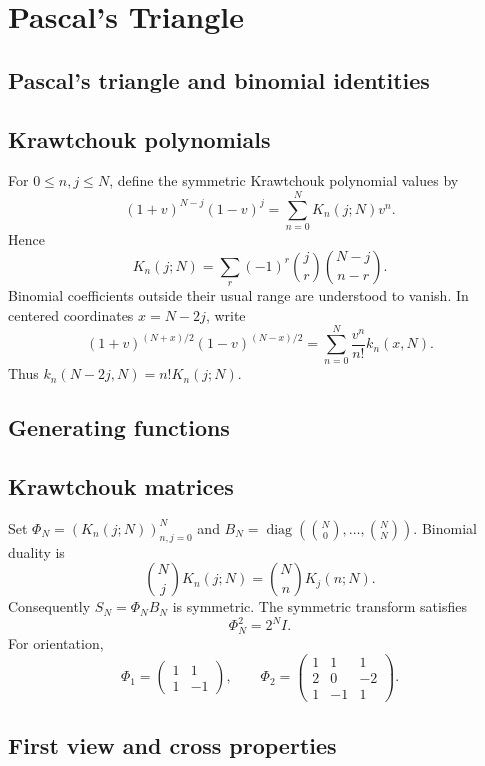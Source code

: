 \chapter{Pascal's Triangle}
\label{ch:1}
\section{Pascal's triangle and binomial identities}
\label{sec:1-1}

\section{Krawtchouk polynomials}
\label{sec:1-2}
For $0\leq n,j\leq N$, define the symmetric Krawtchouk polynomial values by
\begin{equation}\label{eq:gen}
(1+v)^{N-j}(1-v)^j=\sum_{n=0}^N K_n(j;N)v^n.
\end{equation}
Hence
\[
K_n(j;N)=\sum_r(-1)^r\binom jr\binom{N-j}{n-r}.
\]
Binomial coefficients outside their usual range are understood to vanish.
In centered coordinates $x=N-2j$, write
\[
(1+v)^{(N+x)/2}(1-v)^{(N-x)/2}
=\sum_{n=0}^N\frac{v^n}{n!}k_n(x,N).
\]
Thus $k_n(N-2j,N)=n!K_n(j;N)$.

\section{Generating functions}
\label{sec:1-3}

\section{Krawtchouk matrices}
\label{sec:1-4}
Set $\Phi_N=(K_n(j;N))_{n,j=0}^N$ and
$B_N=\operatorname{diag}(\binom N0,\ldots,\binom NN)$. Binomial duality is
\[
\binom Nj K_n(j;N)=\binom Nn K_j(n;N).
\]
Consequently $S_N=\Phi_NB_N$ is symmetric. The symmetric transform satisfies
\[
\Phi_N^2=2^NI.
\]
For orientation,
\[
\Phi_1=\begin{pmatrix}1&1\\1&-1\end{pmatrix},\qquad
\Phi_2=\begin{pmatrix}1&1&1\\2&0&-2\\1&-1&1\end{pmatrix}.
\]

\section{First view and cross properties}
\label{sec:1-5}

